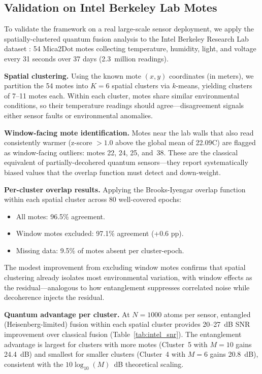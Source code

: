 \documentclass[twocolumn,11pt]{article}
\begin{document}
\subsection{Validation on Intel Berkeley Lab Motes}

To validate the framework on a real large-scale sensor deployment,
we apply the spatially-clustered quantum fusion analysis to the
Intel Berkeley Research Lab dataset \cite{madden2004intel}:
54 Mica2Dot motes collecting temperature, humidity, light, and
voltage every 31 seconds over 37 days (2.3~million readings).

\textbf{Spatial clustering.}
Using the known mote $(x,y)$ coordinates (in meters), we partition
the 54 motes into $K=6$ spatial clusters via $k$-means, yielding
clusters of 7--11 motes each.
Within each cluster, motes share similar environmental conditions,
so their temperature readings should agree---disagreement signals
either sensor faults or environmental anomalies.

\textbf{Window-facing mote identification.}
Motes near the lab walls that also read consistently warmer
(z-score $> 1.0$ above the global mean of 22.09\textdegree C)
are flagged as window-facing outliers: motes 22, 24, 25, and~38.
These are the classical equivalent of partially-decohered quantum
sensors---they report systematically biased values that the overlap
function must detect and down-weight.

\textbf{Per-cluster overlap results.}
Applying the Brooks-Iyengar overlap function within each spatial
cluster across 80 well-covered epochs:
\begin{itemize}
    \item All motes: 96.5\% agreement.
    \item Window motes excluded: 97.1\% agreement (+0.6 pp).
    \item Missing data: 9.5\% of motes absent per cluster-epoch.
\end{itemize}
The modest improvement from excluding window motes confirms that
spatial clustering already isolates most environmental variation,
with window effects as the residual---analogous to how entanglement
suppresses correlated noise while decoherence injects the residual.

\textbf{Quantum advantage per cluster.}
At $N = 1000$ atoms per sensor, entangled (Heisenberg-limited)
fusion within each spatial cluster provides 20--27~dB SNR
improvement over classical fusion (Table~\ref{tab:intel_snr}).
The entanglement advantage is largest for clusters with more motes
(Cluster~5 with $M = 10$ gains 24.4~dB) and smallest for
smaller clusters (Cluster~4 with $M = 6$ gains 20.8~dB),
consistent with the $10\log_{10}(M)$~dB theoretical scaling.
\end{document}
